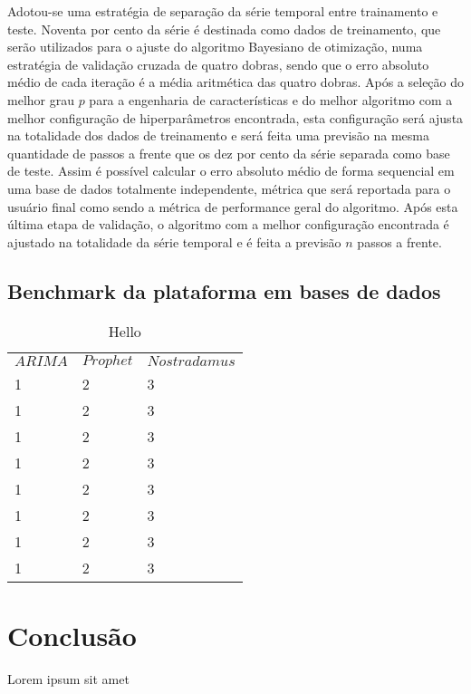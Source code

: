 \documentclass[twocolumn]{rbef}
\newcommand{\1}{\mathbbm{1}}
\begin{document}
Adotou-se uma estratégia de separação da série temporal entre trainamento e teste. Noventa por cento da série é destinada como dados de treinamento, que serão utilizados para o ajuste do algoritmo Bayesiano de otimização, numa estratégia de validação cruzada de quatro dobras, sendo que o erro absoluto médio de cada iteração é a média aritmética das quatro dobras. Após a seleção do melhor grau $p$ para a engenharia de características e do melhor algoritmo com a melhor configuração de hiperparâmetros encontrada, esta configuração será ajusta na totalidade dos dados de treinamento e será feita uma previsão na mesma quantidade de passos a frente que os dez por cento da série separada como base de teste. Assim é possível calcular o erro absoluto médio de forma sequencial em uma base de dados totalmente independente, métrica que será reportada para o usuário final como sendo a métrica de performance geral do algoritmo. Após esta última etapa de validação, o algoritmo com a melhor configuração encontrada é ajustado na totalidade da série temporal e é feita a previsão $n$ passos a frente.

\subsection{Benchmark da plataforma em bases de dados} \label{benchmark}

\begin{table}[!htb]
    \caption{Hello}
    \center
    \begin{tabular}{lll}
        $ARIMA$ & $Prophet$ & $Nostradamus$ \\
        1 & 2 & 3  \\
        1 & 2 & 3  \\
        1 & 2 & 3  \\
        1 & 2 & 3  \\
        1 & 2 & 3  \\
        1 & 2 & 3  \\
        1 & 2 & 3  \\
        1 & 2 & 3  \\
    \end{tabular}
\end{table}

\section{Conclusão}

Lorem ipsum
sit amet
\end{document}
